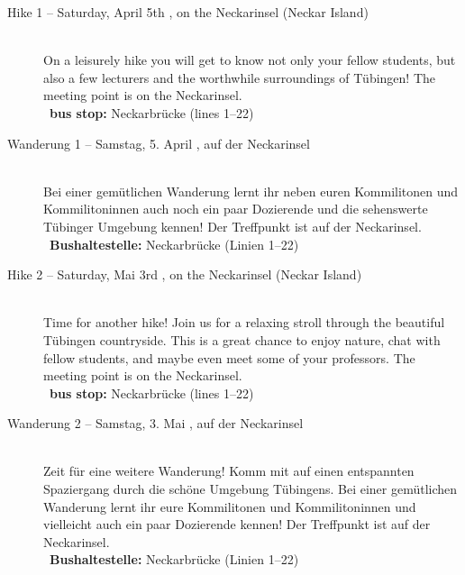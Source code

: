 \begin{description}
\ifml
\item[Hike 1 -- Saturday, April 5th \YEAR, on the Neckarinsel (Neckar Island)]~\\
On a leisurely hike you will get to know not only your fellow students,
but also a few lecturers and the worthwhile surroundings of Tübingen!
The meeting point is on the Neckarinsel.\\
~\textbf{bus stop:} Neckarbrücke (lines 1--22)
\else
\item[Wanderung 1 -- Samstag, 5. April \YEAR, auf der Neckarinsel]~\\
Bei einer gemütlichen Wanderung lernt ihr neben euren Kommilitonen und Kommilitoninnen auch
noch ein paar Dozierende und die sehenswerte Tübinger Umgebung kennen!
Der Treffpunkt ist auf der Neckarinsel.\\
~\textbf{Bushaltestelle:} Neckarbrücke (Linien 1--22)
\fi

\ifml
    \item[Hike 2 -- Saturday, Mai 3rd \YEAR, on the Neckarinsel (Neckar Island)]~\\
    Time for another hike! Join us for a relaxing stroll through the beautiful Tübingen countryside.
    This is a great chance to enjoy nature, chat with fellow students, and maybe even meet some of your professors.
    The meeting point is on the Neckarinsel.\\
    ~\textbf{bus stop:} Neckarbrücke (lines 1--22)
\else
    \item[Wanderung 2 -- Samstag, 3. Mai \YEAR, auf der Neckarinsel]~\\
    Zeit für eine weitere Wanderung! Komm mit auf einen entspannten Spaziergang durch die schöne Umgebung Tübingens.
    Bei einer gemütlichen Wanderung lernt ihr eure Kommilitonen und Kommilitoninnen
    und vielleicht auch ein paar Dozierende kennen!
    Der Treffpunkt ist auf der Neckarinsel.\\
    ~\textbf{Bushaltestelle:} Neckarbrücke (Linien 1--22)
\fi


\end{description}
